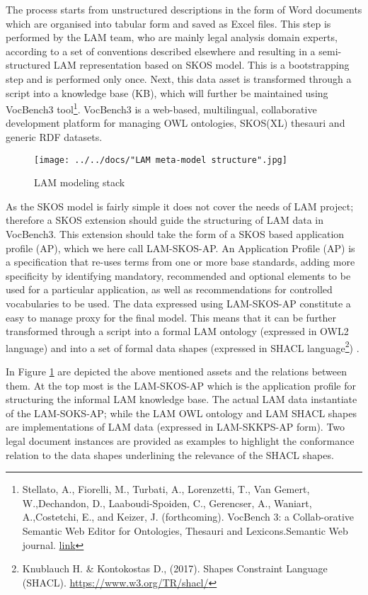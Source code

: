 The process starts from unstructured descriptions in the form of Word
documents which are organised into tabular form and saved as Excel
files. This step is performed by the LAM team, who are mainly legal
analysis domain experts, according to a set of conventions described
elsewhere and resulting in a semi-structured LAM representation based on
SKOS model. This is a bootstrapping step and is performed only once.
Next, this data asset is transformed through a script into a knowledge
base (KB), which will further be maintained using VocBench3
tool\footnote{Stellato, A., Fiorelli,
	M., Turbati, A., Lorenzetti, T., Van Gemert, W.,Dechandon, D., Laaboudi-Spoiden, C., Gerencser, A., Waniart, A.,Costetchi, E., and Keizer, J. (forthcoming). VocBench 3: a Collab-orative Semantic Web Editor for Ontologies, Thesauri and Lexicons.Semantic Web journal. \href{http://www.semantic-web-journal.net/content/vocbench-3-collaborative-semantic-web-editor-ontologies-thesauri-and-lexicons-1}{link}}. VocBench3 is a
web-based, multilingual, collaborative development platform for managing
OWL ontologies, SKOS(XL) thesauri and generic RDF datasets.

\begin{figure}[!ht]
	\centering
	\texttt{[image: ../../docs/"LAM meta-model structure".jpg]}
	\caption{LAM modeling stack}
	\label{fig:meta-model}
\end{figure}

As the SKOS model is fairly simple it does not cover the needs of LAM
project; therefore a SKOS extension should guide the structuring of LAM
data in VocBench3. This extension should take the form of a SKOS based
application profile (AP), which we here call LAM-SKOS-AP. An Application
Profile (AP) is a specification that re-uses terms from one or more base
standards, adding more specificity by identifying mandatory, recommended
and optional elements to be used for a particular application, as well
as recommendations for controlled vocabularies to be used. The data
expressed using LAM-SKOS-AP constitute a easy to manage proxy for the
final model. This means that it can be further transformed through a
script into a formal LAM ontology (expressed in OWL2 language) and into
a set of formal data shapes (expressed in SHACL
language\footnote{Knublauch H. \& Kontokostas D., (2017). Shapes Constraint Language (SHACL). \url{https://www.w3.org/TR/shacl/}}) .

In Figure \ref{fig:meta-model} are depicted the above mentioned assets and the
relations between them. At the top most is the LAM-SKOS-AP which is the
application profile for structuring the informal LAM knowledge base. The
actual LAM data instantiate of the LAM-SOKS-AP; while the LAM OWL
ontology and LAM SHACL shapes are implementations of LAM data (expressed
in LAM-SKKPS-AP form). Two legal document instances are provided as
examples to highlight the conformance relation to the data shapes
underlining the relevance of the SHACL shapes.

